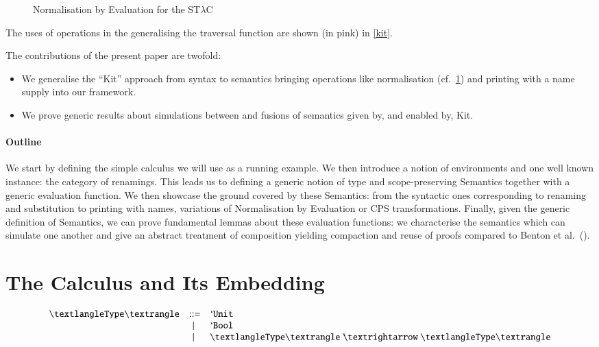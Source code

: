 \begin{figure}[h]
\caption{Normalisation by Evaluation for the ST$λ$C\label{nbe}}
\end{figure}

The uses of  operations in the generalising
the traversal function  are shown (in pink) in \cref{kit}.

The contributions of the present paper are twofold:
\begin{itemize}
\item{} We generalise the ``Kit'' approach from syntax to semantics
bringing operations like normalisation (cf.~\cref{nbe}) and printing
with a name supply into our framework.

\item{} We  prove
generic results about simulations between and fusions of semantics
given by, and enabled by, Kit.
\end{itemize}

\paragraph{Outline} We start by defining the simple calculus we will
use as a running example. We then introduce a notion of environments
and one well known instance: the category of renamings. This leads us
to defining a generic notion of type and scope-preserving Semantics
together with a generic evaluation function. We then showcase the
ground covered by these Semantics: from the syntactic ones
corresponding to renaming and substitution to printing with names,
variations of Normalisation by Evaluation or CPS transformations.
Finally, given the generic
definition of Semantics, we can prove fundamental lemmas about these
evaluation functions: we characterise the semantics which can simulate
one another and give an abstract treatment of composition yielding
compaction and reuse of proofs compared to Benton et
al.~(\citeyear{benton2012strongly}).

\section{The Calculus and Its Embedding}


\[
\begin{array}{lcl}
⟨\type{}⟩ & ::=    & \unit{} \\
          & \mid{} & \bool{} \\
          & \mid{} & \arrow{⟨\type{}⟩}{⟨\type{}⟩}
\end{array}
\]
